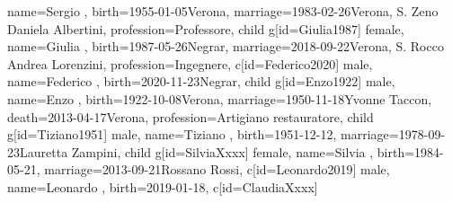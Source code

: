 \documentclass{article}
\begin{document}
\begin{midpage}
\begin{center}
\begin{genealogypicture}
{{{{{{{{                                name={Sergio },
                                birth={1955-01-05}{Verona},
                                marriage={1983-02-26}{Verona, S. Zeno \newline Daniela Albertini},
                                profession={Professore},
                            }
                            child{
                                g[id=Giulia1987]{
                                    female,
                                    name={Giulia },
                                    birth={1987-05-26}{Negrar},
                                    marriage={2018-09-22}{Verona, S. Rocco \newline Andrea Lorenzini},
                                    profession={Ingegnere},
                                }
                                c[id=Federico2020]{
                                    male,
                                    name={Federico },
                                    birth={2020-11-23}{Negrar},
                                }
                            }
                        }
                    }
                    child{
                        g[id=Enzo1922]{
                            male,
                            name={Enzo },
                            birth={1922-10-08}{Verona},
                            marriage={1950-11-18}{Yvonne Taccon},
                            death={2013-04-17}{Verona},
                            profession={Artigiano restauratore},
                        }
                        child{
                            g[id=Tiziano1951]{
                                male,
                                name={Tiziano },
                                birth={1951-12-12}{},
                                marriage={1978-09-23}{Lauretta Zampini},
                            }
                            child{
                                g[id=SilviaXxxx]{
                                    female,
                                    name={Silvia },
                                    birth={1984-05-21}{},
                                    marriage={2013-09-21}{Rossano Rossi},
                                }
                                c[id=Leonardo2019]{
                                    male,
                                    name={Leonardo },
                                    birth={2019-01-18}{},
                                }
                            }
                            c[id=ClaudiaXxxx]{
}}}}}}}}
\end{genealogypicture}
\end{center}
\end{midpage}
\end{document}
